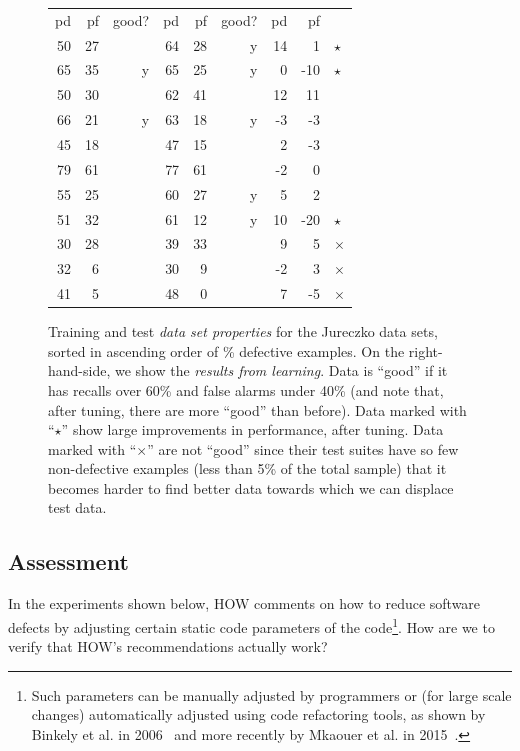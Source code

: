 \documentclass[conference]{IEEEtran}
\begin{document}
\begin{figure}[!t]
\begin{center}
\begin{minipage}{.4\linewidth}
\begin{tabular}{|rrr|rrr|rr|l}
  pd & pf & good? & pd & pf & good? & pd & pf\\\cline{1-8}
  50 & 27 &   & 64 & 28 & y & 14 & 1&$\star$\\
  65 & 35 & y & 65 & 25 & y & 0 & -10&$\star$\\
  50 & 30 &   & 62 & 41 &   & 12 & 11\\
  66 & 21 & y & 63 & 18 & y & -3 & -3\\
  45 & 18 &   & 47 & 15 &   & 2 & -3\\
  79 & 61 &   & 77 & 61 &   & -2 & 0\\
  55 & 25 &   & 60 & 27 & y & 5 & 2\\
  51 & 32 &   & 61 & 12 & y & 10 & -20&$\star$\\
 30 & 28 &   & 39 & 33 &   & 9 & 5&$\times$\\
  32 & 6 &   & 30 & 9 &   & -2 & 3&$\times$\\
  41 & 5 &   & 48 & 0 &   & 7 & -5&$\times$\\
\hline 
\end{tabular}

\end{minipage}
\end{center}    
  
    \caption{Training and test {\em data set properties} for the Jureczko data sets,
    sorted in ascending order of \% defective examples.
    On the right-hand-side, we show the {\em results from learning}.
    Data is ``good'' if it has   recalls over 60\% and false alarms under 40\%
(and note that, after tuning, there are more ``good'' than before).
Data   marked with ``$\star$'' show large improvements in performance, after tuning.
Data   marked with ``$\times$'' are not ``good'' since their test suites  have so few non-defective examples (less than 5\% of the total sample) that it becomes harder to find better data towards which we can displace test data.
}\label{fig:j}
\end{figure}




\subsection{Assessment}\label{sect:assess}
In the experiments shown below,  HOW comments  on how to reduce
software defects by adjusting certain static code parameters of the code\footnote{Such parameters can be manually adjusted by programmers or (for large scale changes) automatically adjusted using code refactoring
tools, as shown by Binkely et al. in 2006~\cite{Binkley2006} and more recently by Mkaouer et al. in 2015~\cite{Mkaouer15}.}. How are we to verify that HOW's recommendations actually work? 
\end{document}
